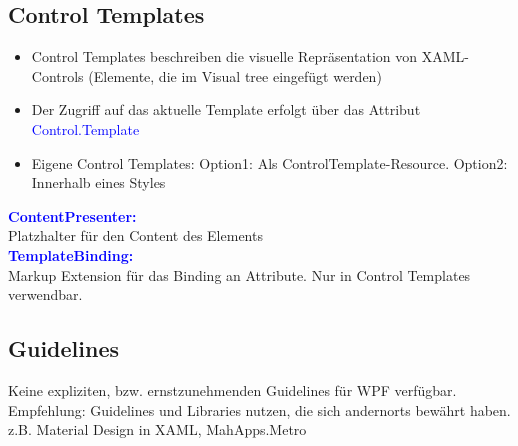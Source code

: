 \subsection{Control Templates}
\begin{itemize}[topsep=0pt, leftmargin=4mm]
    \setlength\itemsep{-0.3em}
    \item Control Templates beschreiben die visuelle Repräsentation von XAML-Controls (Elemente, die im Visual tree eingefügt werden)
    \item Der Zugriff auf das aktuelle Template erfolgt über das Attribut \textcolor{blue}{Control.Template}
    \item Eigene Control Templates: Option1: Als ControlTemplate-Resource. Option2: Innerhalb eines Styles
\end{itemize}
\textbf{\textcolor{blue}{ContentPresenter:}}\\
Platzhalter für den Content des Elements\\
\textbf{\textcolor{blue}{TemplateBinding:}}\\
Markup Extension für das Binding an Attribute. Nur in Control Templates verwendbar.
\subsection{Guidelines}
Keine expliziten, bzw. ernstzunehmenden Guidelines für WPF verfügbar. Empfehlung: Guidelines und Libraries
nutzen, die sich andernorts bewährt haben. z.B. Material Design in XAML, MahApps.Metro
\pagebreak